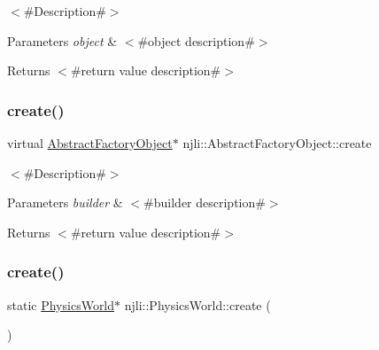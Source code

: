 $<$\#\+Description\#$>$


\begin{DoxyParams}{Parameters}
{\em object} & $<$\#object description\#$>$\\
\hline
\end{DoxyParams}
\begin{DoxyReturn}{Returns}
$<$\#return value description\#$>$ 
\end{DoxyReturn}
\mbox{\label{classnjli_1_1_physics_world_a83a8876ae63b92804004cf3febe76573}} 
\subsubsection{\texorpdfstring{create()}{create()}\hspace{0.1cm}{\footnotesize\ttfamily [1/3]}}
{\footnotesize\ttfamily virtual \mbox{\hyperlink{classnjli_1_1_abstract_factory_object}{Abstract\+Factory\+Object}}$\ast$ njli\+::\+Abstract\+Factory\+Object\+::create}

$<$\#\+Description\#$>$


\begin{DoxyParams}{Parameters}
{\em builder} & $<$\#builder description\#$>$\\
\hline
\end{DoxyParams}
\begin{DoxyReturn}{Returns}
$<$\#return value description\#$>$ 
\end{DoxyReturn}
\mbox{\label{classnjli_1_1_physics_world_a7bbce96ef8fd04a42161cccf07eb1944}} 
\subsubsection{\texorpdfstring{create()}{create()}\hspace{0.1cm}{\footnotesize\ttfamily [2/3]}}
{\footnotesize\ttfamily static \mbox{\hyperlink{classnjli_1_1_physics_world}{Physics\+World}}$\ast$ njli\+::\+Physics\+World\+::create (\begin{DoxyParamCaption}{ }\end{DoxyParamCaption})\hspace{0.3cm}{\ttfamily [static]}}

